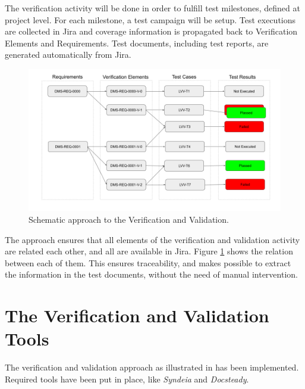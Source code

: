 The verification activity will be done in order to fulfill test milestones, defined at project level.
For each milestone, a test campaign will be setup. 
Test executions are collected in Jira and coverage information is propagated back to Verification Elements and Requirements.
Test documents, including test reports, are generated automatically from Jira.

\begin{figure}
\begin{center}
\includegraphics[width=\textwidth]{imgs/VandVSchema.png}
 \caption{Schematic approach to the Verification and Validation.}
 \label{fig:vandvschema}
\end{center}
\end{figure}

The approach ensures that all elements of the verification and validation activity are related each other, and all are available in Jira.
Figure \ref{fig:vandvschema} shows the relation between each of them.
This ensures traceability, and makes possible to extract the information in the test documents, without the need of manual intervention.


\section{The Verification and Validation Tools}

The verification and validation approach as illustrated in \cite{10.1117/12.2310125}  has been implemented.
Required tools have been put in place, like \textit{Syndeia} and \textit{Docsteady}.

